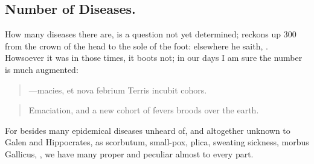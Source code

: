 {\subsection{Number of Diseases.}
How many diseases there are, is a question not yet determined;
\Pliny{} reckons up 300 from the crown of the head to the sole
of the foot: elsewhere he saith, . Howsoever it was in those times, it boots not; in our days
I am sure the number is much augmented:
%
\begin{latin}
\begin{quote}
---macies, et nova febrium
Terris incubit cohors.
\end{quote}
\end{latin}
\translationrule
\begin{quote}%
Emaciation, and a new cohort of fevers broods over the earth.
\end{quote}

For besides many epidemical diseases unheard of, and altogether unknown
to Galen and Hippocrates, as scorbutum, small-pox, plica, sweating
sickness, morbus Gallicus, \etc{}, we have many proper and peculiar almost
to every part.

}
